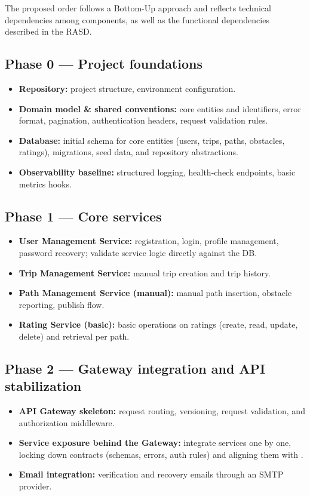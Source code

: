 The proposed order follows a Bottom-Up approach and reflects technical dependencies among components, as well as the functional dependencies described in the RASD.

\subsection{Phase 0 --- Project foundations}
\begin{itemize}
    \item \textbf{Repository:} project structure, environment configuration.
    \item \textbf{Domain model \& shared conventions:} core entities and identifiers, error format, pagination, authentication headers, request validation rules.
    \item \textbf{Database:} initial schema for core entities (users, trips, paths, obstacles, ratings), migrations, seed data, and repository abstractions.
    \item \textbf{Observability baseline:} structured logging, health-check endpoints, basic metrics hooks.
\end{itemize}

\subsection{Phase 1 --- Core services}
\begin{itemize}
    \item \textbf{User Management Service:} registration, login, profile management, password recovery; validate service logic directly against the DB.
    \item \textbf{Trip Management Service:} manual trip creation and trip history.
    \item \textbf{Path Management Service (manual):} manual path insertion, obstacle reporting, publish flow.
    \item \textbf{Rating Service (basic):} basic operations on ratings (create, read, update, delete) and retrieval per path.
\end{itemize}

\subsection{Phase 2 --- Gateway integration and API stabilization}
\begin{itemize}
    \item \textbf{API Gateway skeleton:} request routing, versioning, request validation, and authorization middleware.
    \item \textbf{Service exposure behind the Gateway:} integrate services one by one, locking down contracts (schemas, errors, auth rules) and aligning them with .
    \item \textbf{Email integration:} verification and recovery emails through an SMTP provider.
\end{itemize}

